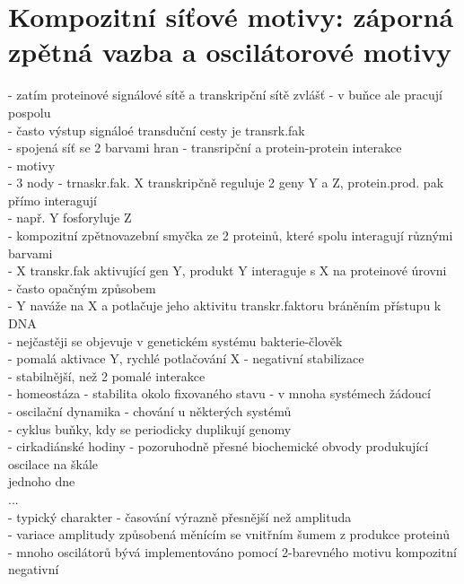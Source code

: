 \documentclass[11pt,a4paper]{report}
\begin{document}
\section{Kompozitní síťové motivy: záporná zpětná vazba a oscilátorové motivy}
- zatím proteinové signálové sítě a transkripční sítě zvlášť - v buňce ale pracují pospolu\\
\indent - často výstup signáloé transduční cesty je transrk.fak\\
- spojená síť se 2 barvami hran - transripční a protein-protein interakce\\
- motivy\\
\indent - 3 nody - trnaskr.fak. X transkripčně reguluje 2 geny Y a Z, protein.prod. pak přímo interagují\\
\indent \indent - např. Y fosforyluje Z\\
\indent - kompozitní zpětnovazební smyčka ze 2 proteinů, které spolu interagují různými barvami\\
\indent \indent - X transkr.fak aktivující gen Y, produkt Y interaguje s X na proteinové úrovni\\
\indent \indent \indent - často opačným způsobem\\
\indent \indent \indent - Y naváže na X a potlačuje jeho aktivitu transkr.faktoru bráněním přístupu k DNA\\
\indent \indent \indent \indent - nejčastěji se objevuje v genetickém systému bakterie-člověk\\
\indent \indent \indent - pomalá aktivace Y, rychlé potlačování X - negativní stabilizace\\
\indent \indent \indent \indent - stabilnější, než 2 pomalé interakce\\
- homeostáza - stabilita okolo fixovaného stavu - v mnoha systémech žádoucí\\
- oscilační dynamika - chování u některých systémů\\
\indent - cyklus buňky, kdy se periodicky duplikují genomy\\
\indent - cirkadiánské hodiny - pozoruhodně přesné biochemické obvody produkující oscilace na škále\\
\indent \indent jednoho dne\\
\indent ...\\
\indent - typický charakter - časování výrazně přesnější než amplituda\\
\indent \indent - variace amplitudy způsobená měnícím se vnitřním šumem z produkce proteinů\\
\indent - mnoho oscilátorů bývá implementováno pomocí 2-barevného motivu kompozitní negativní\\
\end{document}
